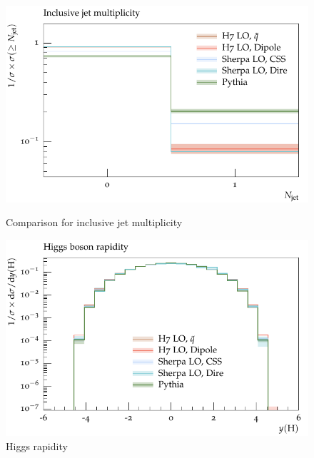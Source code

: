\begin{figure}[h]
  \centering
  \begin{minipage}[t]{0.49\textwidth}
    \includegraphics[width=1\textwidth]{plots/H-125-MuShower/LH_H/jet_multi_inclusive.pdf}
    \caption{Comparison for inclusive jet multiplicity}
    \label{fig:h:jet_multi_inc}
  \end{minipage}
  \begin{minipage}[t]{0.49\textwidth}
    \includegraphics[width=1\textwidth]{plots/H-125-MuShower/LH_H/X_y.pdf}
    \caption{Higgs rapidity}
    \label{fig:h:y}
  \end{minipage}
\end{figure}

